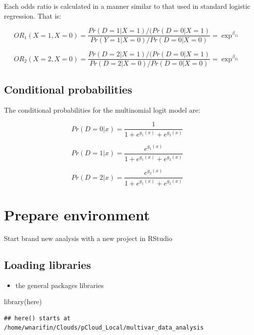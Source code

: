 \documentclass[
  10pt,
]{krantz}
\newenvironment{Shaded}{\begin{snugshade}}{\end{snugshade}}
\newcommand{\FunctionTok}[1]{\textcolor[rgb]{0.00,0.00,0.00}{#1}}
\newcommand{\NormalTok}[1]{#1}
\providecommand{\tightlist}{%
  \setlength{\itemsep}{0pt}\setlength{\parskip}{0pt}}
\begin{document}
Each odds ratio is calculated in a manner similar to that used in standard logistic regression. That is:

\[OR_1(X=1,X=0)= \frac{Pr(D=1|X=1)/(Pr(D=0|X=1)} {Pr(Y=1|X=0)/Pr(D=0|X=0)}=\exp^{\beta_{11}}\]

\[OR_2(X=2,X=0)= \frac{Pr(D=2|X=1)/(Pr(D=0|X=1)} {Pr(D=2|X=0)/Pr(D=0|X=0)}=\exp^{\beta_{21}}\]

\hypertarget{conditional-probabilities}{%
\subsection{\texorpdfstring{Conditional probabilities}{Conditional probabilities}}\label{conditional-probabilities}}

The conditional probabilities for the multinomial logit model are:

\[Pr(D = 0 | x) = \frac{1}{1+e^{g_1(x)} + e^{g_2(x)}}\]

\[Pr(D = 1 | x) = \frac{e^{g_1(x)}}{1+e^{g_1(x)} + e^{g_2(x)}}\]

\[Pr(D = 2 | x) = \frac{e^{g_2(x)}}{1+e^{g_1(x)} + e^{g_2(x)}}\]

\hypertarget{prepare-environment}{%
\section{Prepare environment}\label{prepare-environment}}

Start brand new analysis with a new project in RStudio

\hypertarget{loading-libraries-1}{%
\subsection{Loading libraries}\label{loading-libraries-1}}

\begin{itemize}
\tightlist
\item
  the general packages libraries
\end{itemize}

\begin{Shaded}
\begin{Highlighting}[]
\FunctionTok{library}\NormalTok{(here)}
\end{Highlighting}
\end{Shaded}

\begin{verbatim}
## here() starts at /home/wnarifin/Clouds/pCloud_Local/multivar_data_analysis
\end{verbatim}
\end{document}
